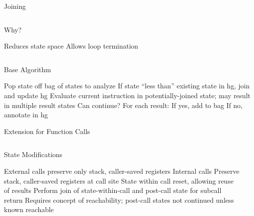 \begin{frame}{Joining}
  \begin{columns}
    \begin{block}{Why?}
      \begin{outline}
        \1 Reduces state space
        \1 Allows loop termination
      \end{outline}
    \end{block}

    \begin{example}[Join]
    \end{example}
  \end{columns}
\end{frame}

\begin{frame}{Base Algorithm}
  \begin{outline}[enumerate]
    \1 Pop state off \gls{bag} of states to analyze
    \1 If state \alert{``less than''} existing state in \gls{hg}, join and update \gls{hg}
    \1 Evaluate current instruction in potentially-joined state; may result in multiple result states
    \1 Can continue? For each result:
      \2 If yes, add to bag
      \2 If no, annotate in \gls{hg}
  \end{outline}
\end{frame}

\begin{frame}{Extension for Function Calls}
  \begin{columns}
    \begin{block}{State Modifications}
      \begin{outline}
        \1 External calls preserve only stack, \alert{caller-saved} registers
        \1 Internal calls
          \2 Preserve stack, \alert{caller-saved} registers at call site
          \2 State within call reset, allowing reuse of results
          \2 Perform join of state-within-call and post-call state for subcall return
        \1 Requires concept of \alert{reachability}; post-call states not continued unless known reachable
      \end{outline}
    \end{block}

    \begin{example}
    \end{example}
  \end{columns}
\end{frame}

